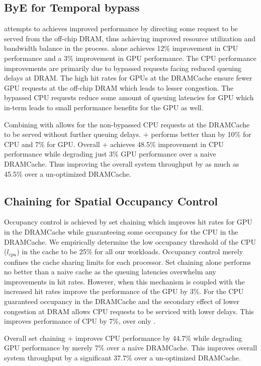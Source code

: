 \subsection{ByE for Temporal bypass}
\par \bypassname attempts to achieves improved performance by directing some request to be served from the off-chip DRAM, thus achieving improved resource utilization and bandwidth balance in the process. \bypassname alone achieves 12\% improvement in CPU performance and a 3\% improvement in GPU performance. The CPU performance improvements are primarily due to bypassed requests facing reduced queuing delays at DRAM. The high hit rates for GPUs at the DRAMCache ensure fewer GPU requests at the off-chip DRAM which leads to lesser congestion. The bypassed CPU requests reduce some amount of queuing latencies for GPU which in-term leads to small performance benefits for the GPU as well.
\par Combining \bypassname with \prioname allows for the non-bypassed CPU requests at the DRAMCache to be served without further queuing delays. \bypassname + \prioname performs better than \prioname by 10\% for CPU and 7\% for GPU. Overall \bypassname + \prioname achieves 48.5\% improvement in CPU performance while degrading just 3\% GPU performance over a naive DRAMCache. Thus improving the overall system throughput by as much as 45.5\% over a un-optimized DRAMCache.

\subsection{Chaining for Spatial Occupancy Control}
Occupancy control is achieved by set chaining which improves hit rates for GPU in the DRAMCache while guaranteeing some occupancy for the CPU in the DRAMCache. We empirically determine the low occupancy threshold of the CPU (\textit{$l_{cpu}$}) in the cache to be 25\% for all our workloads. Occupancy control merely confines the cache sharing limits for each processor. Set chaining alone performs no better than a naive cache as the queuing latencies overwhelm any improvements in hit rates. However, when this mechanism is coupled with \prioname the increased hit rates improve the performance of the GPU by 3\%. For the CPU guaranteed occupancy in the DRAMCache and the secondary effect of lower congestion at DRAM allows CPU requests to be serviced with lower delays. This improves performance of CPU by 7\%, over only \prioname.
\par Overall set chaining + \prioname improves CPU performance by 44.7\% while degrading GPU performance by merely 7\% over a naive DRAMCache. This improves overall system throughput by a significant 37.7\% over a un-optimized DRAMCache.

